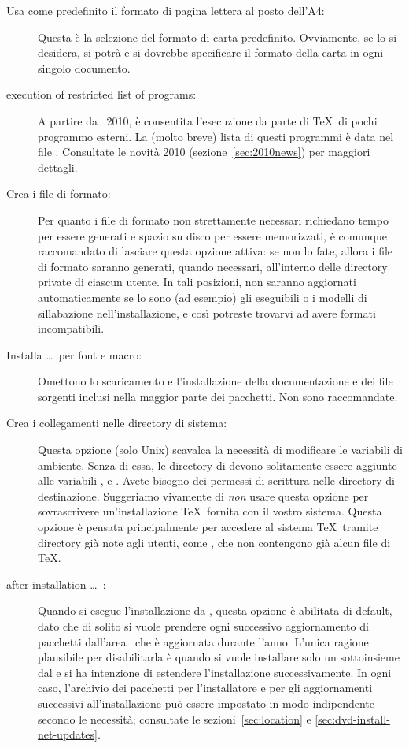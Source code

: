 \documentclass{article}
\begin{document}
\begin{description}
\item[Usa come predefinito il formato di pagina lettera al posto dell'A4:]
  Questa è la selezione del formato di carta predefinito. Ovviamente, se
  lo si desidera, si potrà e si dovrebbe specificare il formato della
  carta in ogni singolo documento.

\item[execution of restricted list of programs:] A partire da \TL\ 2010,
  è consentita l'esecuzione da parte di \TeX\ di pochi programmo esterni.
  La (molto breve) lista di questi programmi è data nel file
  . Consultate le novità 2010
  (sezione~\ref{sec:2010news}) per maggiori dettagli.

\item[Crea i file di formato:] Per quanto i file di formato non
  strettamente necessari richiedano tempo per essere generati e spazio su
  disco per essere memorizzati, è comunque raccomandato di lasciare questa
  opzione attiva: se non lo fate, allora i file di formato saranno
  generati, quando necessari, all'interno delle directory private
   di ciascun utente. In tali posizioni, non saranno
  aggiornati automaticamente se lo sono (ad esempio) gli eseguibili o i
  modelli di sillabazione nell'installazione, e così potreste trovarvi ad
  avere formati incompatibili.

\item[Installa \ldots\ per font e macro:] Omettono lo scaricamento e
  l'installazione della documentazione e dei file sorgenti inclusi nella
  maggior parte dei pacchetti. Non sono raccomandate.

\item[Crea i collegamenti nelle directory di sistema:] Questa opzione
  (solo Unix) scavalca la necessità di modificare le variabili di ambiente.
  Senza di essa, le directory di \TL{} devono solitamente essere aggiunte
  alle variabili ,  e .
  Avete bisogno dei permessi di scrittura nelle directory di destinazione.
  Suggeriamo vivamente di \emph{non} usare questa opzione per
  sovrascrivere un'installazione \TeX\ fornita con il vostro sistema.
  Questa opzione è pensata principalmente per accedere al sistema \TeX\
  tramite directory già note agli utenti, come ,
  che non contengono già alcun file di \TeX.

\item[after installation \ldots\ \CTAN:] Quando si esegue l'installazione
  da \DVD, questa opzione è abilitata di default, dato che di solito si
  vuole prendere ogni successivo aggiornamento di pacchetti dall'area
  \CTAN\ che è aggiornata durante l'anno. L'unica ragione plausibile per
  disabilitarla è quando si vuole installare solo un sottoinsieme dal \DVD
  e si ha intenzione di estendere l'installazione successivamente. In
  ogni caso, l'archivio dei pacchetti per l'installatore e per gli
  aggiornamenti successivi all'installazione può essere impostato in modo
  indipendente secondo le necessità; consultate le sezioni~\ref{sec:location}
  e \ref{sec:dvd-install-net-updates}.
\end{description}
\end{document}
